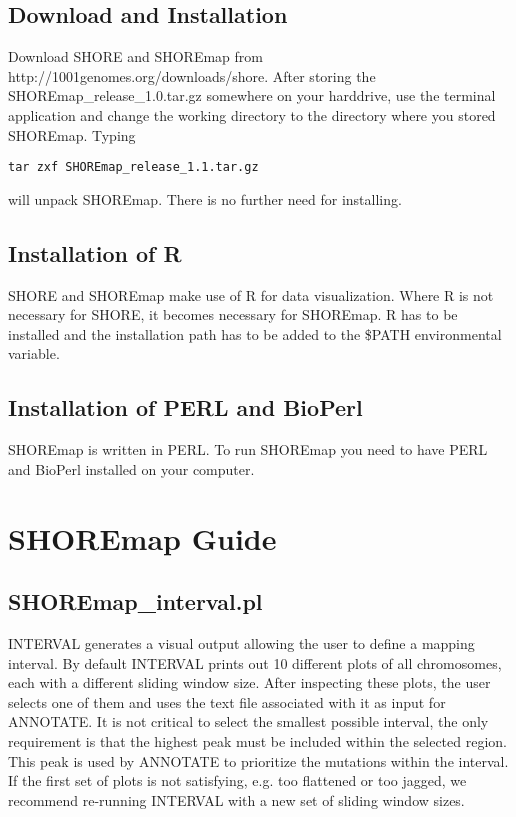 \documentclass[a4paper,10pt]{scrartcl}
\begin{document}
\subsection{Download and Installation}

Download SHORE and SHOREmap from http://1001genomes.org/downloads/shore. After storing the SHOREmap\_release\_1.0.tar.gz somewhere on your harddrive, use the terminal application and change the working directory to the directory where you stored SHOREmap. Typing

\begin{verbatim}
tar zxf SHOREmap_release_1.1.tar.gz
\end{verbatim}

will unpack SHOREmap. There is no further need for installing.

\subsection{Installation of R}

SHORE and SHOREmap make use of R for data visualization. Where R is not necessary for SHORE, it becomes necessary for SHOREmap. R has to be installed and the installation path has to be added to the \$PATH environmental variable.\\

\subsection{Installation of PERL and BioPerl}

SHOREmap is written in PERL. To run SHOREmap you need to have PERL and BioPerl installed on your computer.

\newpage
\section{SHOREmap Guide}

\subsection{SHOREmap\_interval.pl}

INTERVAL generates a visual output allowing the user to define a mapping interval. By default INTERVAL prints out 10 different plots of all chromosomes, each with a different sliding window size. After inspecting these plots, the user selects one of them and uses the text file associated with it as input for ANNOTATE. It is not critical to select the smallest possible interval, the only requirement is that the highest peak must be included within the selected region. This peak is used by ANNOTATE to prioritize the mutations within the interval.
If the first set of plots is not satisfying, e.g. too flattened or too jagged, we recommend re-running INTERVAL with a new set of sliding window sizes.
\end{document}
